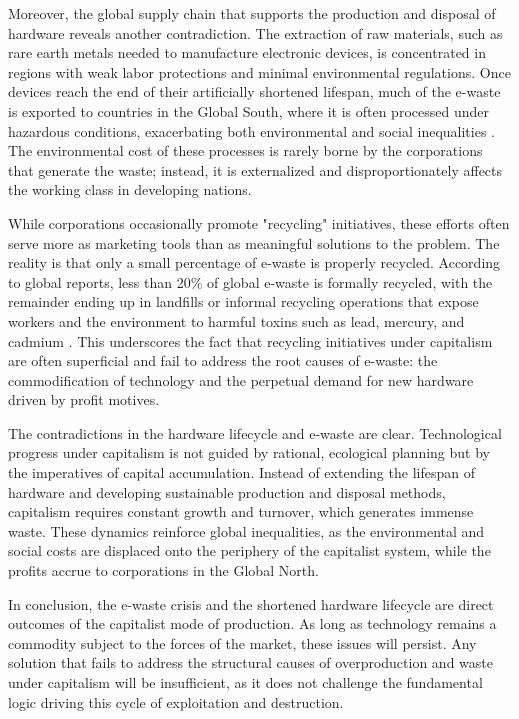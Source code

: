 Moreover, the global supply chain that supports the production and disposal of hardware reveals another contradiction. The extraction of raw materials, such as rare earth metals needed to manufacture electronic devices, is concentrated in regions with weak labor protections and minimal environmental regulations. Once devices reach the end of their artificially shortened lifespan, much of the e-waste is exported to countries in the Global South, where it is often processed under hazardous conditions, exacerbating both environmental and social inequalities \cite[pp.~31-32]{heacock2016}. The environmental cost of these processes is rarely borne by the corporations that generate the waste; instead, it is externalized and disproportionately affects the working class in developing nations.

While corporations occasionally promote "recycling" initiatives, these efforts often serve more as marketing tools than as meaningful solutions to the problem. The reality is that only a small percentage of e-waste is properly recycled. According to global reports, less than 20\% of global e-waste is formally recycled, with the remainder ending up in landfills or informal recycling operations that expose workers and the environment to harmful toxins such as lead, mercury, and cadmium \cite[pp.~10-11]{forti2020}. This underscores the fact that recycling initiatives under capitalism are often superficial and fail to address the root causes of e-waste: the commodification of technology and the perpetual demand for new hardware driven by profit motives.

The contradictions in the hardware lifecycle and e-waste are clear. Technological progress under capitalism is not guided by rational, ecological planning but by the imperatives of capital accumulation. Instead of extending the lifespan of hardware and developing sustainable production and disposal methods, capitalism requires constant growth and turnover, which generates immense waste. These dynamics reinforce global inequalities, as the environmental and social costs are displaced onto the periphery of the capitalist system, while the profits accrue to corporations in the Global North.

In conclusion, the e-waste crisis and the shortened hardware lifecycle are direct outcomes of the capitalist mode of production. As long as technology remains a commodity subject to the forces of the market, these issues will persist. Any solution that fails to address the structural causes of overproduction and waste under capitalism will be insufficient, as it does not challenge the fundamental logic driving this cycle of exploitation and destruction.

